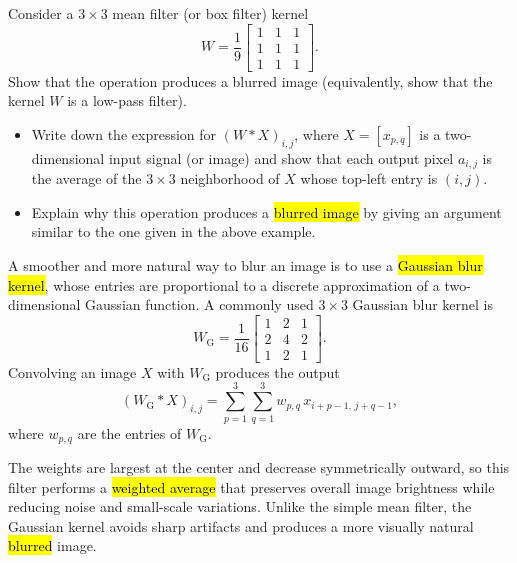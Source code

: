 \begin{problem}
Consider a $3\times3$ mean filter (or box filter) kernel
\[
W = \frac{1}{9}
\begin{bmatrix}
1 & 1 & 1\\
1 & 1 & 1\\
1 & 1 & 1
\end{bmatrix}.
\]
Show that the operation produces a blurred image (equivalently, show that the kernel $W$ is a low-pass filter).
\end{problem}
\begin{hint}
\begin{itemize}
\item Write down the expression for $(W * X)_{i,j}$, where $X = [x_{p,q}]$ is a two-dimensional input signal (or image) and show that each output pixel $a_{i,j}$ is the average of the $3\times3$ neighborhood of $X$ whose top-left entry is $(i,j)$.
\item Explain why this operation produces a \hl{blurred image} by giving an argument similar to the one given in the above example.
\end{itemize}
\end{hint}
\begin{example}

A smoother and more natural way to blur an image is to use a \hl{Gaussian blur kernel},
whose entries are proportional to a discrete approximation of a two-dimensional Gaussian function.  
A commonly used $3\times3$ Gaussian blur kernel is
$$
W_{\text{G}} = \frac{1}{16}
\begin{bmatrix}
1 & 2 & 1\\
2 & 4 & 2\\
1 & 2 & 1
\end{bmatrix}.
$$
Convolving an image $X$ with $W_{\text{G}}$ produces the output
$$
(W_{\text{G}} * X)_{i,j}
= \sum_{p=1}^{3}\sum_{q=1}^{3}
w_{p,q}\, x_{i+p-1,\,j+q-1},
$$
where $w_{p,q}$ are the entries of $W_{\text{G}}$.

\medskip
The weights are largest at the center and decrease symmetrically outward,
so this filter performs a \hl{weighted average} that preserves overall image brightness
while reducing noise and small-scale variations.  
Unlike the simple mean filter, the Gaussian kernel avoids sharp artifacts and
produces a more visually natural \hl{blurred} image.
\end{example}
